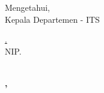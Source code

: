 \begin{center}
  Mengetahui, \\
  Kepala Departemen \department{} \facultyshort{} - ITS\\

  \vspace{8ex}

  \underline{\headofdepartment{}.} \\
  NIP. \headofdepartmentnip{}
\end{center}

\begin{center}
  \textbf{\MakeUppercase{\place{}}\\\MONTH{}, \the\year{}}
\end{center}
\endgroup
